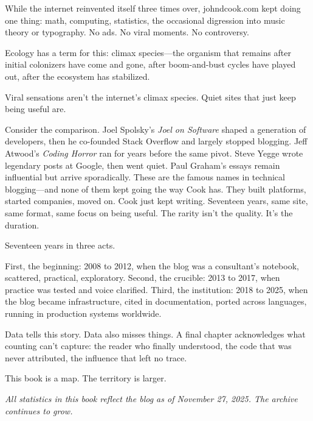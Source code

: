 While the internet reinvented itself three times over, johndcook.com kept doing one thing: math, computing, statistics, the occasional digression into music theory or typography. No ads. No viral moments. No controversy.

Ecology has a term for this: climax species---the organism that remains after initial colonizers have come and gone, after boom-and-bust cycles have played out, after the ecosystem has stabilized.

Viral sensations aren't the internet's climax species. Quiet sites that just keep being useful are.

Consider the comparison. Joel Spolsky's \textit{Joel on Software} shaped a generation of developers, then he co-founded Stack Overflow and largely stopped blogging. Jeff Atwood's \textit{Coding Horror} ran for years before the same pivot. Steve Yegge wrote legendary posts at Google, then went quiet. Paul Graham's essays remain influential but arrive sporadically. These are the famous names in technical blogging---and none of them kept going the way Cook has. They built platforms, started companies, moved on. Cook just kept writing. Seventeen years, same site, same format, same focus on being useful. The rarity isn't the quality. It's the duration.

\bigskip

Seventeen years in three acts.

First, the beginning: 2008 to 2012, when the blog was a consultant's notebook, scattered, practical, exploratory. Second, the crucible: 2013 to 2017, when practice was tested and voice clarified. Third, the institution: 2018 to 2025, when the blog became infrastructure, cited in documentation, ported across languages, running in production systems worldwide.

Data tells this story. Data also misses things. A final chapter acknowledges what counting can't capture: the reader who finally understood, the code that was never attributed, the influence that left no trace.

This book is a map. The territory is larger.

\bigskip

\textit{All statistics in this book reflect the blog as of November 27, 2025. The archive continues to grow.}

